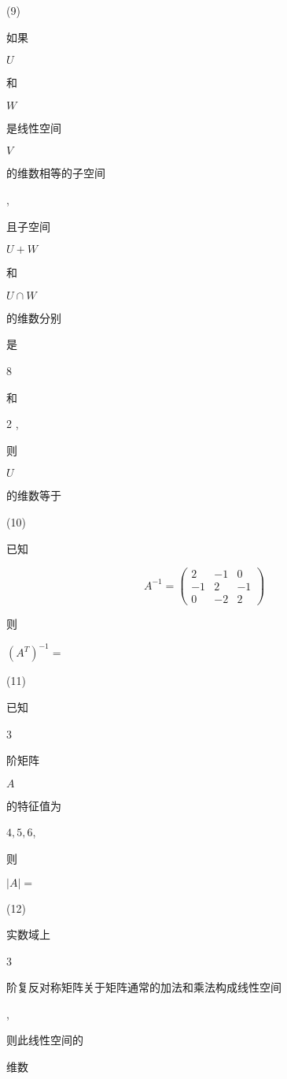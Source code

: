 \documentclass[10pt]{article}
\begin{document}
(9) \begin{CJK}{UTF8}{mj}如果\end{CJK} $U$ \begin{CJK}{UTF8}{mj}和\end{CJK} $W$ \begin{CJK}{UTF8}{mj}是线性空间\end{CJK} $V$ \begin{CJK}{UTF8}{mj}的维数相等的子空间\end{CJK}, \begin{CJK}{UTF8}{mj}且子空间\end{CJK} $U+W$ \begin{CJK}{UTF8}{mj}和\end{CJK} $U \cap W$ \begin{CJK}{UTF8}{mj}的维数分别\end{CJK} \begin{CJK}{UTF8}{mj}是\end{CJK} 8 \begin{CJK}{UTF8}{mj}和\end{CJK} 2 , \begin{CJK}{UTF8}{mj}则\end{CJK} $U$ \begin{CJK}{UTF8}{mj}的维数等于\end{CJK} (10) \begin{CJK}{UTF8}{mj}已知\end{CJK}
$$
A^{-1}=\left(\begin{array}{ccc}
2 & -1 & 0 \\
-1 & 2 & -1 \\
0 & -2 & 2
\end{array}\right)
$$
\begin{CJK}{UTF8}{mj}则\end{CJK} $\left(A^{T}\right)^{-1}=$

(11) \begin{CJK}{UTF8}{mj}已知\end{CJK} 3 \begin{CJK}{UTF8}{mj}阶矩阵\end{CJK} $A$ \begin{CJK}{UTF8}{mj}的特征值为\end{CJK} $4,5,6$, \begin{CJK}{UTF8}{mj}则\end{CJK} $|A|=$

(12) \begin{CJK}{UTF8}{mj}实数域上\end{CJK} 3 \begin{CJK}{UTF8}{mj}阶复反对称矩阵关于矩阵通常的加法和乘法构成线性空间\end{CJK}, \begin{CJK}{UTF8}{mj}则此线性空间的\end{CJK} \begin{CJK}{UTF8}{mj}维数\end{CJK}
\end{document}
